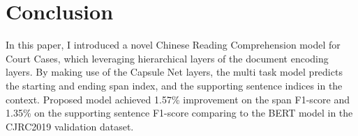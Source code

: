\documentclass[11pt,a4paper]{article}
\begin{document}
%

\section{Conclusion}

In this paper, I introduced a novel Chinese Reading Comprehension model for Court Cases, which leveraging hierarchical layers of the document encoding layers.
By making use of the Capsule Net layers, the multi task model predicts the starting and ending span index, and the supporting sentence indices in the context.
Proposed model achieved 1.57\% improvement on the span F1-score and 1.35\% on the supporting sentence F1-score comparing to the BERT model in the CJRC2019 validation dataset.





\end{document}
